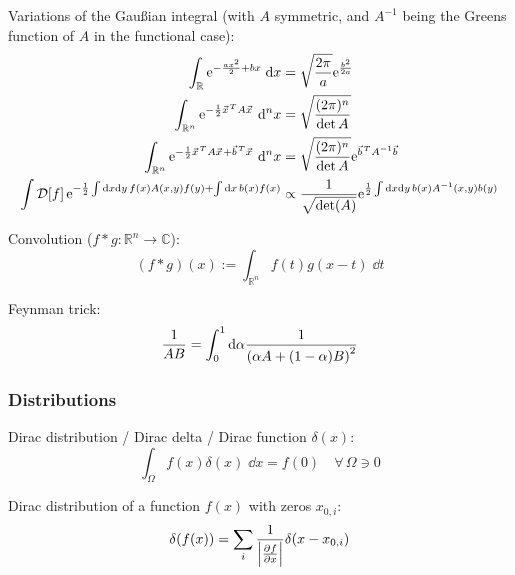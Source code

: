 			\noindent
			Variations of the Gaußian integral (with $A$ symmetric, and $A^{-1}$ being the Greens function of $A$ in the functional case):
			\begin{equation}
				\begin{aligned}
					\int_\mathbb{R} \ex^{-\frac{a x^2}{2}+ b x}\;\dd x &= \sqrt{\frac{2\pi}{a}} \ex^{\frac{b^2}{2 a}}\\
					\int_{\mathbb{R}^n} \ex^{-\frac{1}{2} \vec{x}^T A \vec{x}}\;\dd^n x  
					&= \sqrt{\frac{(2\pi)^n}{\det A}}\\
					\int_{\mathbb{R}^n} \ex^{-\frac{1}{2} \vec{x}^T A \vec{x} + \vec{b}^T \vec{x}}\;\dd^n x  
					&= \sqrt{\frac{(2\pi)^n}{\det A}} \ex^{\vec{b}^T A^{-1} \vec{b}}\\
					\int \mathcal{D}\qty[f]\, \ex^{-\frac{1}{2} \int \dd x \dd y \, f(x) A(x, y) f(y) + \int \dd x\,b(x)f(x)}
					&\propto \frac{1}{\sqrt{\det(A)}}\ex^{\frac{1}{2} \int \dd x \dd y \, b(x) A^{-1}(x,y) b(y)}
				\end{aligned}
			\end{equation}

			\noindent
			Convolution ($f*g:\mathbb{R}^n \rightarrow \mathbb{C}$):
			\begin{equation}
				(f*g)(x) := \int_{\mathbb{R}^n} f(t) g(x-t)\;\dd t
			\end{equation}

			\noindent
			Feynman trick:
			\begin{equation}
				\frac{1}{AB} = \int_0^1 \dd\alpha \frac{1}{\qty(\alpha A + (1-\alpha)B)^2}
			\end{equation}

			\noindent

		\subsubsection{Distributions}
			\noindent
			Dirac distribution / Dirac delta / Dirac function $\delta(x)$:
			\begin{equation}
				\int_\Omega f(x)\delta(x)\;\dd x = f(0)\quad\forall\, \Omega\ni 0
			\end{equation}

			\noindent
			Dirac distribution of a function $f(x)$ with zeros $x_{0,i}$:
			\begin{equation}
				\delta(f(x)) = \sum_i \frac{1}{\abs{\pdv{f}{x}(x_{0,i})}}\delta(x-x_{0,i})
			\end{equation}


